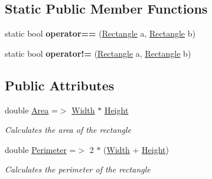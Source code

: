 \subsection*{Static Public Member Functions}
\begin{DoxyCompactItemize}
\item 
\mbox{\label{class_s_g_l_1_1_rectangle_ae3cb95607d2ca2ba4b963e1e8cb27455}} 
static bool {\bfseries operator==} (\mbox{\hyperlink{class_s_g_l_1_1_rectangle}{Rectangle}} a, \mbox{\hyperlink{class_s_g_l_1_1_rectangle}{Rectangle}} b)
\item 
\mbox{\label{class_s_g_l_1_1_rectangle_a0c05f32a38285138e07df100f598ac5f}} 
static bool {\bfseries operator!=} (\mbox{\hyperlink{class_s_g_l_1_1_rectangle}{Rectangle}} a, \mbox{\hyperlink{class_s_g_l_1_1_rectangle}{Rectangle}} b)
\end{DoxyCompactItemize}
\subsection*{Public Attributes}
\begin{DoxyCompactItemize}
\item 
double \mbox{\hyperlink{class_s_g_l_1_1_rectangle_ac84a60fb0f1f84cc3f36e488e5aafc29}{Area}} =$>$ \mbox{\hyperlink{class_s_g_l_1_1_rectangle_a717f64d0b1a88f2901ebb53bf5fdac72}{Width}} $\ast$ \mbox{\hyperlink{class_s_g_l_1_1_rectangle_ae241fbf3d3bc711d0046d10e1954baa2}{Height}}
\begin{DoxyCompactList}\small\item\em Calculates the area of the rectangle \end{DoxyCompactList}\item 
double \mbox{\hyperlink{class_s_g_l_1_1_rectangle_ae8af552e7b19677d60d33977ce2d39dc}{Perimeter}} =$>$ 2 $\ast$ (\mbox{\hyperlink{class_s_g_l_1_1_rectangle_a717f64d0b1a88f2901ebb53bf5fdac72}{Width}} + \mbox{\hyperlink{class_s_g_l_1_1_rectangle_ae241fbf3d3bc711d0046d10e1954baa2}{Height}})
\begin{DoxyCompactList}\small\item\em Calculates the perimeter of the rectangle \end{DoxyCompactList}\end{DoxyCompactItemize}
